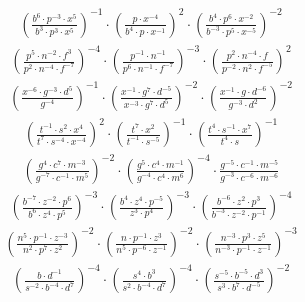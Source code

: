 \begin{align}
\left(\frac{b^{6}\cdot p^{-3}\cdot x^{5}}{b^{3}\cdot p^{3}\cdot x^{5}}\right)^{-1}\cdot \left(\frac{p\cdot x^{-4}}{b^{4}\cdot p\cdot x^{-1}}\right)^{2}\cdot \left(\frac{b^{4}\cdot p^{6}\cdot x^{-2}}{b^{-3}\cdot p^{5}\cdot x^{-5}}\right)^{-2}
\end{align}
\begin{align}
\left(\frac{p^{5}\cdot n^{-2}\cdot f^{3}}{p^{2}\cdot n^{-4}\cdot f^{-7}}\right)^{-4}\cdot \left(\frac{p^{-1}\cdot n^{-1}}{p^{6}\cdot n^{-1}\cdot f^{-7}}\right)^{-3}\cdot \left(\frac{p^{2}\cdot n^{-4}\cdot f}{p^{-2}\cdot n^{2}\cdot f^{-5}}\right)^{2}
\end{align}
\begin{align}
\left(\frac{x^{-6}\cdot g^{-3}\cdot d^{5}}{g^{-4}}\right)^{-1}\cdot \left(\frac{x^{-1}\cdot g^{7}\cdot d^{-5}}{x^{-3}\cdot g^{7}\cdot d^{5}}\right)^{-2}\cdot \left(\frac{x^{-1}\cdot g\cdot d^{-6}}{g^{-3}\cdot d^{2}}\right)^{-2}
\end{align}
\begin{align}
\left(\frac{t^{-1}\cdot s^{2}\cdot x^{4}}{t^{7}\cdot s^{-4}\cdot x^{-4}}\right)^{2}\cdot \left(\frac{t^{7}\cdot x^{2}}{t^{-1}\cdot s^{-5}}\right)^{-1}\cdot \left(\frac{t^{4}\cdot s^{-1}\cdot x^{7}}{t^{4}\cdot s}\right)^{-1}
\end{align}
\begin{align}
\left(\frac{g^{4}\cdot c^{7}\cdot m^{-3}}{g^{-7}\cdot c^{-1}\cdot m^{5}}\right)^{-2}\cdot \left(\frac{g^{5}\cdot c^{4}\cdot m^{-1}}{g^{-4}\cdot c^{4}\cdot m^{6}}\right)^{-4}\cdot \frac{g^{-5}\cdot c^{-1}\cdot m^{-5}}{g^{-3}\cdot c^{-6}\cdot m^{-6}}
\end{align}
\begin{align}
\left(\frac{b^{-7}\cdot z^{-2}\cdot p^{6}}{b^{6}\cdot z^{4}\cdot p^{5}}\right)^{-3}\cdot \left(\frac{b^{4}\cdot z^{4}\cdot p^{-5}}{z^{3}\cdot p^{4}}\right)^{-3}\cdot \left(\frac{b^{-6}\cdot z^{2}\cdot p^{3}}{b^{-3}\cdot z^{-2}\cdot p^{-1}}\right)^{-4}
\end{align}
\begin{align}
\left(\frac{n^{5}\cdot p^{-1}\cdot z^{-3}}{n^{2}\cdot p^{7}\cdot z^{2}}\right)^{-2}\cdot \left(\frac{n\cdot p^{-1}\cdot z^{3}}{n^{5}\cdot p^{-6}\cdot z^{-1}}\right)^{-2}\cdot \left(\frac{n^{-3}\cdot p^{3}\cdot z^{5}}{n^{-3}\cdot p^{-1}\cdot z^{-1}}\right)^{-3}
\end{align}
\begin{align}
\left(\frac{b\cdot d^{-1}}{s^{-2}\cdot b^{-4}\cdot d^{7}}\right)^{-4}\cdot \left(\frac{s^{4}\cdot b^{3}}{s^{2}\cdot b^{-4}\cdot d^{7}}\right)^{-4}\cdot \left(\frac{s^{-5}\cdot b^{-5}\cdot d^{3}}{s^{3}\cdot b^{7}\cdot d^{-5}}\right)^{-2}
\end{align}
